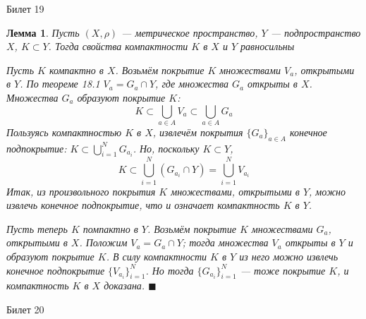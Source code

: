 \documentclass[12pt,a4paper]{article}
\newtheorem*{lemma*}{Лемма}
\begin{document}
\begin{center}
Билет 19
\end{center}

\begin{lemma*}
\label{19.1}
Пусть $(X, \rho)$ ---  метрическое пространство, $Y$ --- подпространство $X$, $K \subset Y$. Тогда свойства компактности $K$ в $X$ и $Y$ равносильны

Пусть $K$ компактно в $X$. Возьмём покрытие $K$ множествами $V_a$, открытыми в $Y$. По теореме 18.1 $V_a = G_a \cap Y$, где множества $G_a$ открыты в $X$. Множества $G_a$ образуют покрытие $K$:
$$
K \subset \bigcup\limits_{a\in A}{V_a} \subset \bigcup\limits_{a \in A}{G_a}
$$
Пользуясь компактностью $K$ в $X$, извлечём покрытия $\{G_{a}\}_{a\in A}$ конечное подпокрытие: $K\subset \bigcup\limits_{i=1}^{N}{G_{a_i}}$. Но, поскольку $K \subset Y$,
$$
K \subset \bigcup\limits_{i=1}^{N}{(G_{a_i} \cap Y)} = \bigcup\limits_{i=1}^{N} V_{a_i}
$$
Итак, из произвольного покрытия $K$ множествами, открытыми в $Y$, можно извлечь конечное подпокрытие, что и означает компактность $K$ в $Y$.

Пусть теперь $K$ помпактно в $Y$. Возьмём покрытие $K$ множествами $G_a$, открытыми в $X$. Положим $V_a = G_a \cap Y$; тогда множества $V_a$ открыты в $Y$ и образуют покрытие $K$. В силу компактности $K$ в $Y$ из него можно извлечь конечное подпокрытие $\{V_{a_i}\}_{i=1}^{N}$. Но тогда $\{G_{a_i}\}_{i=1}^{N}$ --- тоже покрытие $K$, и компактность $K$ в $X$ доказана. $\blacksquare$
\end{lemma*}

\begin{center}
Билет 20
\end{center}
\end{document}
